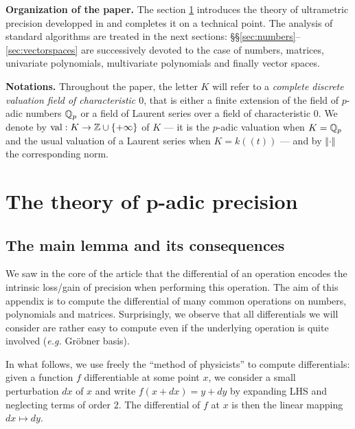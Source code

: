 \documentclass{sig-alternate}
\DeclareMathOperator{\val}{val}
\begin{document}
\medskip

\noindent
{\bf Organization of the paper.}
The section \ref{sec:theory} introduces the theory of ultrametric 
precision developped in \cite{caruso-roe-vaccon:14a} and completes it on a technical 
point. The analysis of standard algorithms are treated in the next
sections: \S\S \ref{sec:numbers}--\ref{sec:vectorspaces} are 
successively devoted to the case of numbers, matrices, univariate 
polynomials, multivariate polynomials and finally vector spaces.

\medskip

\noindent
{\bf Notations.}
Throughout the paper, the letter $K$ will refer to a \emph{complete 
discrete valuation field of characteristic $0$}, that is either a finite 
extension of the field of $p$-adic numbers $\mathbb Q_p$ or a field of Laurent 
series over a field of characteristic $0$. We denote by $\val : K \to \Z 
\cup \{+\infty\}$ of $K$ --- it is the $p$-adic valuation when $K = \mathbb Q_p$ 
and the usual valuation of a Laurent series when $K = k((t))$ --- and by 
$\Vert \cdot \Vert$ the corresponding norm.

\section{The theory of p-adic precision}
\label{sec:theory}

\subsection{The main lemma and its consequences}


{\color{Bittersweet}

We saw in the core of the article that the differential of an operation
encodes the intrinsic loss/gain of precision when performing this
operation. The aim of this appendix is to compute the differential of
many common operations on numbers, polynomials and matrices. Surprisingly,
we observe that all differentials we will consider are rather easy to
compute even if the underlying operation is quite involved (\emph{e.g.}
Gr\"obner basis).

In what follows, we use freely the ``method of physicists'' to compute
differentials: given a function $f$ differentiable at some point $x$, we
consider a small perturbation $dx$ of $x$ and write $f(x+dx) = y + dy$
by expanding LHS and neglecting terms of order $2$. The differential of
$f$ at $x$ is then the linear mapping $dx \mapsto dy$.

}
\end{document}
